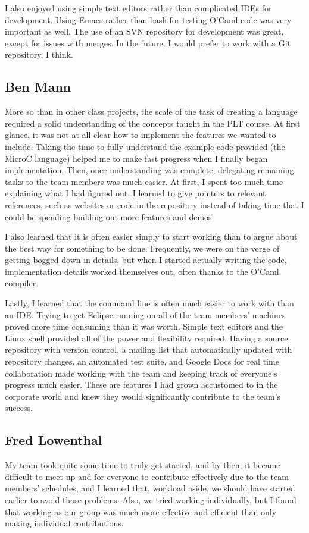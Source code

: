 \documentclass[12pt,A4]{book}
\begin{document}
I also enjoyed using simple text editors rather than complicated IDEs for development. Using Emacs rather than bash for testing O'Caml code was very important as well. The use of an SVN repository for development was great, except for issues with merges. In the future, I would prefer to work with a Git repository, I think.

\subsection{Ben Mann}
More so than in other class projects, the scale of the task of creating a language required a solid understanding of the concepts taught in the PLT course.  At first glance, it was not at all clear how to implement the features we wanted to include.  Taking the time to fully understand the example code provided (the MicroC language) helped me to make fast progress when I finally began implementation.  Then, once understanding was complete, delegating remaining tasks to the team members was much easier.  At first, I spent too much time explaining what I had figured out.  I learned to give pointers to relevant references, such as websites or code in the repository instead of taking time that I could be spending building out more features and demos.

I also learned that it is often easier simply to start working than to argue about the best way for something to be done.  Frequently, we were on the verge of getting bogged down in details, but when I started actually writing the code, implementation details worked themselves out, often thanks to the O'Caml compiler.  

Lastly, I learned that the command line is often much easier to work with than an IDE.  Trying to get Eclipse running on all of the team members' machines proved more time consuming than it was worth.  Simple text editors and the Linux shell provided all of the power and flexibility required.  
Having a source repository with version control, a mailing list that automatically updated with repository changes, an automated test suite, and Google Docs for real time collaboration made working with the team and keeping track of everyone's progress much easier.  These are features I had grown accustomed to in the corporate world and knew they would significantly contribute to the team's success.
\subsection{Fred Lowenthal}
My team took quite some time to truly get started, and by then, it became difficult to meet up and 
for everyone to contribute effectively due to the team members’ schedules, and I learned that, 
workload aside, we should have started earlier to avoid those problems. Also, we tried working 
individually, but I found that working as our group was much more effective and efficient than only
making individual contributions.
\end{document}
